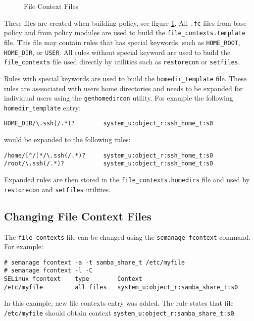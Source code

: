 \begin{figure}
    \centering
    \label{fig:filecontexts}
    
    \caption{File Context Files}
\end{figure}

These files are created when building policy, see figure \ref{fig:filecontexts}.
All \texttt{.fc} files from base policy and from policy modules are used to
build the \texttt{file\_contexts.template} file. This file may contain rules
that has special keywords, such as \texttt{HOME\_ROOT}, \texttt{HOME\_DIR}, or
\texttt{USER}. All rules without special keyword are used to build the
\texttt{file\_contexts} file used directly by utilities such as
\texttt{restorecon} or \texttt{setfiles}.

Rules with special keywords are used to build the \texttt{homedir\_template}
file. These rules are asssociated with users home directories and needs to be
expanded for individual users using the \texttt{genhomedircon} utility. For
example the following \texttt{homedir\_template} entry:
\begin{lstlisting}
HOME_DIR/\.ssh(/.*)?        system_u:object_r:ssh_home_t:s0
\end{lstlisting}
would be expanded to the following rules:
\begin{lstlisting}
/home/[^/]*/\.ssh(/.*)?     system_u:object_r:ssh_home_t:s0
/root/\.ssh(/.*)?           system_u:object_r:ssh_home_t:s0
\end{lstlisting}
Expanded rules are then stored in the \texttt{file\_contexts.homedirs} file and
used by \texttt{restorecon} and \texttt{setfiles} utilities.

\subsection{Changing File Context Files}

The \texttt{file\_contexts} file can be changed using the \texttt{semanage
fcontext} command. For example:
\begin{lstlisting}
# semanage fcontext -a -t samba_share_t /etc/myfile
# semanage fcontext -l -C
SELinux fcontext    type        Context
/etc/myfile         all files   system_u:object_r:samba_share_t:s0
\end{lstlisting}
In this example, new file contexts entry was added. The rule states that file
\texttt{/etc/myfile} should obtain context
\texttt{system\_u:object\_r:samba\_share\_t:s0}.

